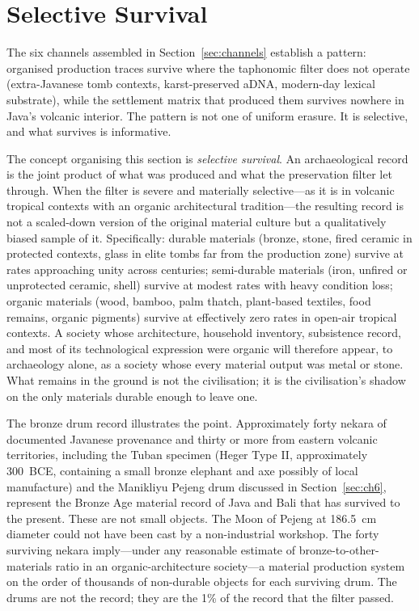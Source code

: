 \documentclass[12pt,a4paper]{article}
\begin{document}
\section{Selective Survival}
\label{sec:selective_survival}

The six channels assembled in Section~\ref{sec:channels} establish a pattern: organised production traces survive where the taphonomic filter does not operate (extra-Javanese tomb contexts, karst-preserved aDNA, modern-day lexical substrate), while the settlement matrix that produced them survives nowhere in Java's volcanic interior. The pattern is not one of uniform erasure. It is selective, and what survives is informative.

The concept organising this section is \textit{selective survival}. An archaeological record is the joint product of what was produced and what the preservation filter let through. When the filter is severe and materially selective---as it is in volcanic tropical contexts with an organic architectural tradition---the resulting record is not a scaled-down version of the original material culture but a qualitatively biased sample of it. Specifically: durable materials (bronze, stone, fired ceramic in protected contexts, glass in elite tombs far from the production zone) survive at rates approaching unity across centuries; semi-durable materials (iron, unfired or unprotected ceramic, shell) survive at modest rates with heavy condition loss; organic materials (wood, bamboo, palm thatch, plant-based textiles, food remains, organic pigments) survive at effectively zero rates in open-air tropical contexts. A society whose architecture, household inventory, subsistence record, and most of its technological expression were organic will therefore appear, to archaeology alone, as a society whose every material output was metal or stone. What remains in the ground is not the civilisation; it is the civilisation's shadow on the only materials durable enough to leave one.

The bronze drum record illustrates the point. Approximately forty nekara of documented Javanese provenance and thirty or more from eastern volcanic territories, including the Tuban specimen (Heger Type II, approximately 300~BCE, containing a small bronze elephant and axe possibly of local manufacture) and the Manikliyu Pejeng drum discussed in Section~\ref{sec:ch6}, represent the Bronze Age material record of Java and Bali that has survived to the present. These are not small objects. The Moon of Pejeng at 186.5~cm diameter could not have been cast by a non-industrial workshop. The forty surviving nekara imply---under any reasonable estimate of bronze-to-other-materials ratio in an organic-architecture society---a material production system on the order of thousands of non-durable objects for each surviving drum. The drums are not the record; they are the 1\% of the record that the filter passed.
\end{document}
